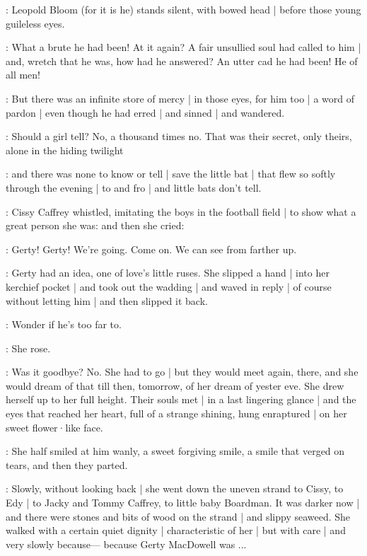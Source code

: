 :
Leopold Bloom
(for it is he)
stands silent,
with bowed head |
before those young guileless eyes.

\Nnovel:
What a brute he had been!
At it again?
A fair unsullied soul had called to him |
and,
wretch that he was,
how had he answered?
An utter cad
he had been!
He of all men!

:
But there was an infinite store of mercy |
in those eyes,
for him too |
a word of pardon |
even though he had erred |
and sinned |
and wandered.

\gertyNovel:
Should a girl tell?%
No,
a thousand times no.
That was their secret,
only theirs,
alone in the hiding twilight

:
and there was none to know or tell |
save the little bat |
that flew so softly through the evening |
to and fro |
and little bats don't tell.

:
Cissy Caffrey whistled,
imitating the boys in the football field |
to show what a great person she was:
and then she cried:

\cissy:
Gerty!
Gerty!
We're going.
Come on.
We can see from farther up.

\gertyNovel:
Gerty had an idea,
one of love's little ruses.
She slipped a hand |
into her kerchief pocket |
and took out the wadding |
and waved in reply |
of course 
without letting him |
and then slipped it back.

\gertySex:
Wonder if he's too far to.

\gertyNovel:
She rose.

\gertyRomantic:
Was it goodbye?%
No.
She had to go |
but they would meet again,
there,
and she would dream of that till then,
tomorrow,
of her dream of yester eve.
She drew herself up to her full height.
Their souls met |
in a last lingering glance |
and the eyes that reached her heart,
full of a strange shining,
hung enraptured |
on her sweet flower·like face.

\gertyNovel:
She half smiled at him wanly,
a sweet forgiving smile,
a smile that verged on tears,
and then they parted.

:
Slowly,
without looking back |
she went down the uneven strand to Cissy,
to Edy |
to Jacky and Tommy Caffrey,
to little baby Boardman.
It was darker now |
and there were stones and bits of wood on the strand |
and slippy seaweed.
She walked with a certain quiet dignity |
characteristic of her |
but with care |%
and very slowly because—%
because Gerty MacDowell was ...

